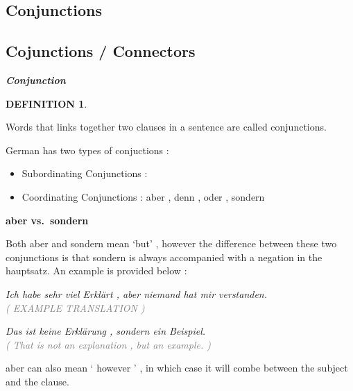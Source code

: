 \documentclass[a4paper,twocolumn,10pt]{article}
\newtheorem{mydef}{DEFINITION}[section]
\newcommand{\newpar}
{\par \vspace{0.3cm}}
\newcommand{\subsectionend}
{
\nolinenumbers
\linenumbers
}
\newcommand{\tcolorboxstart}
{
	\nolinenumbers
	\vspace{0.2cm}
	\centering
}
\newcommand{\tcolorboxend}
{
	\justifying
	\vspace{0.2cm}
	\linenumbers
}
\newcommand{\tcolorboxdefinition}[3]
{

\tcolorboxstart
\begin{defn-bg}

	\begin{defn-title}[width=7cm]{}
	{
		\normalsize \textbf{\textit{#1}}
	}
	\end{defn-title}

	\begin{defn-theword}
	{
		\footnotesize
		\begin{mydef} #2
		\end{mydef}
	}
	\end{defn-theword}


	\begin{defn-content}

	\justify
	#3

	\end{defn-content}

\end{defn-bg}
\tcolorboxend
}
\begin{document}
\subsection{Conjunctions}
\label{ssec:conjunctions}

\subsectionend

\subsection{Cojunctions / Connectors}
\label{ssec:cojunctions_connectors}

\tcolorboxdefinition
{Conjunction}
{\label{def:conjunction}}
{

Words that links together two clauses in a sentence are called conjunctions.\cite{collins_german_grammar}
}


German has two types of conjuctions :


\begin{itemize}[noitemsep]
	\item Subordinating Conjunctions  : 
	\item Coordinating Conjunctions : aber , denn , oder , sondern
\end{itemize}


\textbf{aber vs.\ sondern}

Both aber and sondern mean `but' , however the difference between these two
conjunctions is that sondern is always accompanied with a negation in the
hauptsatz. An example is provided below :


\noindent
\textit{Ich habe sehr viel Erklärt , aber niemand hat mir verstanden.}\\
\textcolor{gray} { \textit{( EXAMPLE TRANSLATION )} } \newpar


\noindent
\textit{Das ist keine Erklärung , sondern ein Beispiel.}\\
\textcolor{gray} { \textit{( That is not an explanation , but an example. )} } \newpar

aber can also mean ` however ' , in which case it will combe between the subject
and the clause.


\end{document}
